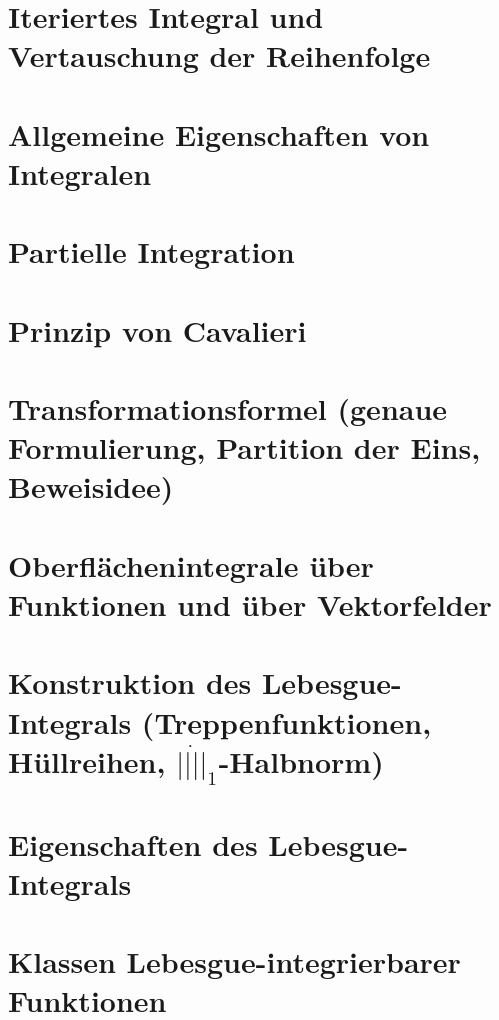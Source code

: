 \section{Iteriertes Integral und Vertauschung der Reihenfolge}

\section{Allgemeine Eigenschaften von Integralen}

\section{Partielle Integration}

\section{Prinzip von Cavalieri}

\section{Transformationsformel (genaue Formulierung, Partition der Eins, Beweisidee)}

\section{Oberfl\"achenintegrale \"uber Funktionen und \"uber Vektorfelder}

\section{Konstruktion des Lebesgue-Integrals (Treppenfunktionen, H\"ullreihen, $||\dot||_1$-Halbnorm)}

\section{Eigenschaften des Lebesgue-Integrals}

\section{Klassen Lebesgue-integrierbarer Funktionen}

